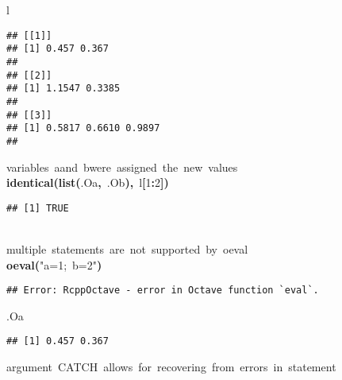 \documentclass[english,10pt,a4paper]{article}\usepackage{graphicx, color}
\makeatletter
\newcommand{\hlnumber}[1]{\textcolor[rgb]{0,0,0}{#1}}%
\newcommand{\hlfunctioncall}[1]{\textcolor[rgb]{0.501960784313725,0,0.329411764705882}{\textbf{#1}}}%
\newcommand{\hlstring}[1]{\textcolor[rgb]{0.6,0.6,1}{#1}}%
\newcommand{\hlkeyword}[1]{\textcolor[rgb]{0,0,0}{\textbf{#1}}}%
\newcommand{\hlcomment}[1]{\textcolor[rgb]{0.180392156862745,0.6,0.341176470588235}{#1}}%
\newcommand{\hlsymbol}[1]{\textcolor[rgb]{0,0,0}{#1}}%
\newcommand{\hlstd}[1]{\textcolor[rgb]{0,0,0}{#1}}%
\newenvironment{kframe}{%
 \def\FrameCommand##1{\hskip\@totalleftmargin \hskip-\fboxsep
 \colorbox{shadecolor}{##1}\hskip-\fboxsep
     \hskip-\linewidth \hskip-\@totalleftmargin \hskip\columnwidth}%
 \MakeFramed {\advance\hsize-\width
   \@totalleftmargin\z@ \linewidth\hsize
   \@setminipage}}%
 {\par\unskip\endMakeFramed}
\newenvironment{knitrout}{}{} %
\makeatother
\begin{document}
\begin{knitrout}
\begin{kframe}
\begin{flushleft}
\hlstd{}\hlsymbol{l}\mbox{}
\normalfont
\end{flushleft}
\begin{verbatim}
## [[1]]
## [1] 0.457 0.367
## 
## [[2]]
## [1] 1.1547 0.3385
## 
## [[3]]
## [1] 0.5817 0.6610 0.9897
## 
\end{verbatim}
\begin{flushleft}
\ttfamily\noindent
\hlcomment{\usebox{\hlnormalsizeboxhash}{\ }variables{\ }\usebox{\hlnormalsizeboxsinglequote}a\usebox{\hlnormalsizeboxsinglequote}{\ }and{\ }\usebox{\hlnormalsizeboxsinglequote}b\usebox{\hlnormalsizeboxsinglequote}{\ }were{\ }assigned{\ }the{\ }new{\ }values}\hspace*{\fill}\\
\hlstd{}\hlfunctioncall{identical}\hlkeyword{(}\hlfunctioncall{list}\hlkeyword{(}\hlsymbol{.O}\hlkeyword{\usebox{\hlnormalsizeboxdollar}}\hlsymbol{a}\hlkeyword{,}{\ }\hlsymbol{.O}\hlkeyword{\usebox{\hlnormalsizeboxdollar}}\hlsymbol{b}\hlkeyword{)}\hlkeyword{,}{\ }\hlsymbol{l}\hlkeyword{[}\hlnumber{1}\hlkeyword{:}\hlnumber{2}\hlkeyword{]}\hlkeyword{)}\mbox{}
\normalfont
\end{flushleft}
\begin{verbatim}
## [1] TRUE
\end{verbatim}
\begin{flushleft}
\ttfamily\noindent
\hspace*{\fill}\\
\hlstd{}\hlcomment{\usebox{\hlnormalsizeboxhash}{\ }multiple{\ }statements{\ }are{\ }not{\ }supported{\ }by{\ }o\usebox{\hlnormalsizeboxunderscore}eval}\hspace*{\fill}\\
\hlstd{}\hlfunctioncall{o\usebox{\hlnormalsizeboxunderscore}eval}\hlkeyword{(}\hlstring{"{}a=1;{\ }b=2"{}}\hlkeyword{)}\mbox{}
\normalfont
\end{flushleft}
\begin{verbatim}
## Error: RcppOctave - error in Octave function `eval`.
\end{verbatim}
\begin{flushleft}
\ttfamily\noindent
\hlsymbol{.O}\hlkeyword{\usebox{\hlnormalsizeboxdollar}}\hlsymbol{a}\mbox{}
\normalfont
\end{flushleft}
\begin{verbatim}
## [1] 0.457 0.367
\end{verbatim}
\begin{flushleft}
\ttfamily\noindent
\hlcomment{\usebox{\hlnormalsizeboxhash}{\ }argument{\ }CATCH{\ }allows{\ }for{\ }recovering{\ }from{\ }errors{\ }in{\ }statement}\hspace*{\fill}\\

\end{flushleft}
\end{kframe}
\end{knitrout}
\end{document}
